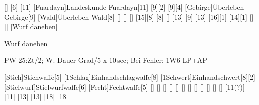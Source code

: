 \documentclass{m5figur-mv}[2016/01/04]
\begin{document}
{[]{}%
[6]
[11]
[Fuardayn]{Landeskunde Fuardayn}[11]%
[9][2]
[9][4]
[Gebirge]{Überleben Gebirge}[9]
[Wald]{Überleben Wald}[8]
[]{}
[]{}
[]{}
[15][8]
[8]
[]{}
[13]
[9]
[13]
[16][1]
[14][1]
[]{}
[]{}
[Wurf daneben]{Wurf daneben\tiny\newline
\begin{minipage}{41mm}\raggedright PW-25:Zt/2; W.-Dauer Grad/5 x 10\,sec;
\newline
Bei Fehler: 1W6 LP+AP\end{minipage}}



[Stich]{Stichwaffe}[5]
[1Schlag]{Einhandschlagwaffe}[8]
[1Schwert]{Einhandschwert}[8][2]
[Stielwurf]{Stielwurfwaffe}[6]
[Fecht]{Fechtwaffe}[5]
[]{}
[]{}
[]{}
[]{}
[]{}
[]{}
[]{}
[]{}
[]{}
[]{}
[]{}
[]{}
[11(?)]
[11]
[13]
[13]
[18]
[18]


%
%
%
%
%

}
\end{document}
